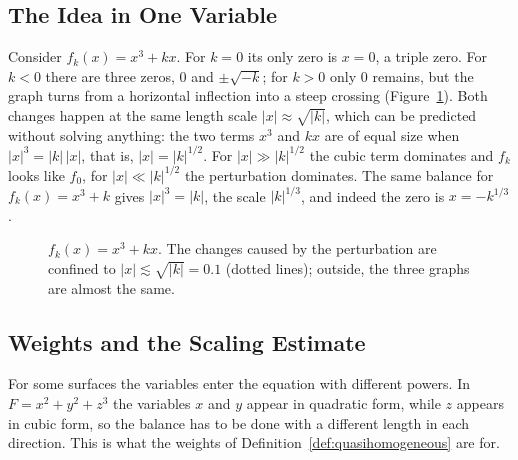 \documentclass[12pt, a4paper, oneside]{book}
\theoremstyle{plain}
\theoremstyle{definition}
\theoremstyle{remark}
\theoremstyle{definition}
\begin{document}
\subsection{The Idea in One Variable}

Consider $f_k(x)=x^3+kx$. For $k=0$ its only zero is $x=0$, a triple zero. For $k<0$ there are three zeros, $0$ and $\pm\sqrt{-k}$; for $k>0$ only $0$ remains, but the graph turns from a horizontal inflection into a steep crossing (Figure~\ref{fig:one-variable}). Both changes happen at the same length scale $|x|\approx\sqrt{|k|}$, which can be predicted without solving anything: the two terms $x^3$ and $kx$ are of equal size when $|x|^3=|k|\,|x|$, that is, $|x|=|k|^{1/2}$. For $|x|\gg|k|^{1/2}$ the cubic term dominates and $f_k$ looks like $f_0$, for $|x|\ll|k|^{1/2}$ the perturbation dominates. The same balance for $f_k(x)=x^3+k$ gives $|x|^3=|k|$, the scale $|k|^{1/3}$, and indeed the zero is $x=-k^{1/3}$.

\begin{figure}[!h]
\centering
{}
\caption[Scaling in one variable]{$f_k(x)=x^3+kx$. The changes caused by the perturbation are confined to $|x|\lesssim\sqrt{|k|}=0.1$ (dotted lines); outside, the three graphs are almost the same.}
\label{fig:one-variable}
\end{figure}

\subsection{Weights and the Scaling Estimate}

For some surfaces the variables enter the equation with different powers. In $F=x^2+y^2+z^3$ the variables $x$ and $y$ appear in quadratic form, while $z$ appears in cubic form, so the balance has to be done with a different length in each direction. This is what the weights of Definition~\ref{def:quasihomogeneous} are for.
\end{document}
